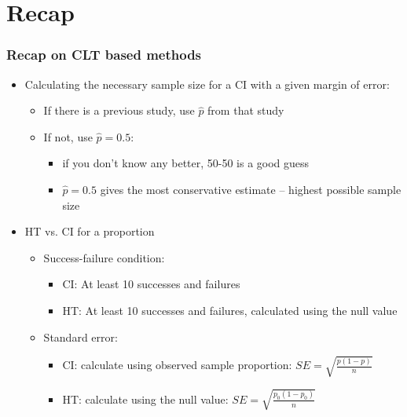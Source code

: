 \documentclass[11pt,containsverbatim,handout,xcolor=xelatex,dvipsnames,table]{beamer}
\begin{document}

\section{Recap}


\begin{frame}
\frametitle{Recap on CLT based methods}

\begin{itemize}

\item Calculating the necessary sample size for a CI with a given margin of error:
\begin{itemize}
\item If there is a previous study, use $\hat{p}$ from that study
\item If not, use $\hat{p} = 0.5$:
\begin{itemize}
\item if you don't know any better, 50-50 is a good guess
\pause
\item $\hat{p} = 0.5$ gives the most conservative estimate -- highest possible sample size
\end{itemize}
\end{itemize}

\item HT vs. CI for a proportion
\begin{itemize}

\item Success-failure condition:
\begin{itemize}
\item CI: At least 10  successes and failures
\item HT: At least 10  successes and failures, calculated using the null value
\end{itemize}

\item Standard error:
\begin{itemize}
\item CI: calculate using observed sample proportion: $SE = \sqrt{\frac{p(1-p)}{n}}$
\item HT: calculate using the null value: $SE = \sqrt{\frac{p_0(1-p_0)}{n}}$
\end{itemize}

\end{itemize}


\end{itemize}

\end{frame}
\end{document}
